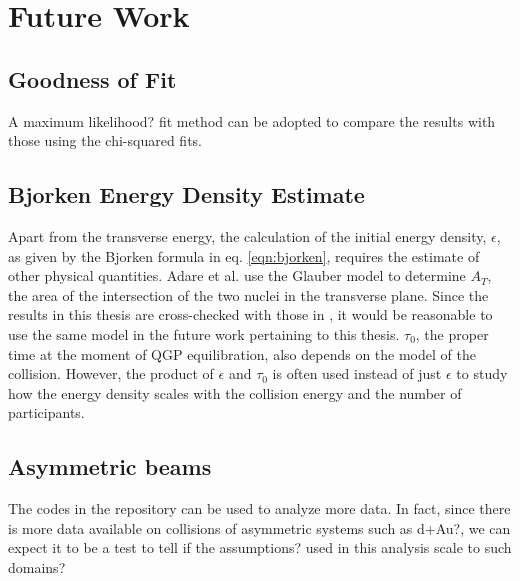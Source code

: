 \chapter{Future Work}\label{ch:future}

\section{Goodness of Fit}
A maximum likelihood? fit method can be adopted to compare the results with those using the chi-squared fits.

\section{Bjorken Energy Density Estimate}
Apart from the transverse energy, the calculation of the initial energy density, $\epsilon$, as given by the Bjorken formula in eq. \ref{eqn:bjorken}, requires the estimate of other physical quantities. Adare et al.\cite{PhysRevC.93.024901} use the Glauber model to determine $A_{T}$, the area of the intersection of the two nuclei in the transverse plane. Since the results in this thesis are cross-checked with those in \cite{PhysRevC.93.024901}, it would be reasonable to use the same model in the future work pertaining to this thesis. $\tau_{0}$, the proper time at the moment of QGP equilibration, also depends on the model of the collision. However, the product of $\epsilon$ and $\tau_{0}$ is often used instead of just $\epsilon$ to study how the energy density scales with the collision energy and the number of participants.

\section{Asymmetric beams}
The codes in the repository can be used to analyze more data. In fact, since there is more data available on collisions of asymmetric systems such as d+Au?, we can expect it to be a test to tell if the assumptions? used in this analysis scale to such domains?


